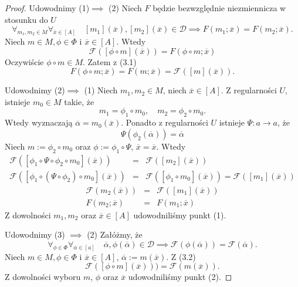 \documentclass[12pt,a4paper]{report}
\newcommand{\domkniecie}[1]{\left\lbrack{#1}\right\rbrack}
\begin{document}
\begin{proof}
Udowodnimy (1)$\implies$ (2)
Niech $F$ będzie bezwzględnie niezmiennicza w stosunku do $U$
\begin{equation}
\forall_{m_{1}, m_{2} \in M}  \forall_{\overline{x} \in \domkniecie{A}} \quad \domkniecie{m_1}(\overline{x}), \domkniecie{m_2}(\overline{x})\in \mathcal{D} \implies F(m_{1};\overline{x})=F(m_{2};\overline{x}).
\end{equation}
Niech $m \in M, \phi \in \Phi$ i $\overline{x} \in \domkniecie{A}$. Wtedy
$$
\mathcal{F}(\domkniecie{\phi \circ m}(\overline{x}))=F(\phi \circ m;\overline{x})
$$
Oczywiście $\phi \circ m \in M$. Zatem z (3.1)
$$
F(\phi \circ m; \overline{x})=F(m;\overline{x})=\mathcal{F}(\domkniecie{m}(\overline{x})).
$$

Udowodnimy (2)$\implies$ (1)
Niech $m_1,m_2 \in M$, niech $\overline{x} \in\domkniecie{A}$.
Z regularności $U$, istnieje $m_0\in M$ takie, że
$$
m_1=\phi_1\circ m_0, \quad m_2=\phi_2\circ m_0.
$$
Wtedy wyznaczają $\overline{\alpha}=m_0(\overline{x})$.
Ponadto z regularności $U$ istnieje $\Psi:a\to a$, że
$$
 \Psi(\phi_2(\overline{\alpha}))=\overline{\alpha}
$$
Niech $m:=\phi_2\circ m_0$ oraz $\phi:=\phi_1\circ\Psi$, $\overline{x}=\overline{x}$. Wtedy
\begin{eqnarray*}
\mathcal{F}(\domkniecie{\phi_1\circ \Psi\circ \phi_2 \circ m_0}(\overline{x})) & = & \mathcal{F}(\domkniecie{m_2}(\overline{x})) \\
\mathcal{F}(\domkniecie{\phi_1\circ(\Psi\circ \phi_2)\circ m_0}(\overline{x})) & = & \mathcal{F}(\domkniecie{\phi_1\circ m_0}(\overline{x})) = \mathcal{F}(\domkniecie{m_1}(\overline{x}))
\end{eqnarray*}
\begin{eqnarray*}
\mathcal{F}(m_2(\overline{x})) & = & \mathcal{F}(\domkniecie{m_1}(\overline{x}))\\
F(m_2;\overline{x}) & = & F(m_1;\overline{x})
\end{eqnarray*}
Z dowolności $m_1,m_2$ oraz $\overline{x} \in \domkniecie{A}$ udowodniliśmy punkt (1).

Udowodnimy (3) $\implies$ (2)
Załóżmy, że
\begin{equation}
\forall_{\phi \in \Phi} \forall_{\overline{\alpha} \in \domkniecie{a}} \quad \overline{\alpha}, \phi(\overline{\alpha})\in \mathcal{D} \implies \mathcal{F}(\phi(\overline{\alpha}))=\mathcal{F}(\overline{\alpha}).
\end{equation}
Niech $m\in M, \phi \in \Phi$ i $\overline{x} \in\domkniecie{A}$, $\overline{\alpha}:=m(\overline{x})$. Z (3.2)
$$
 \mathcal{F}(\domkniecie{\phi\circ m}(\overline{x})))=\mathcal{F}(m(\overline{x})).
$$
Z dowolności wyboru $m$, $\phi$ oraz $\overline{x}$ udowodniliśmy punkt (2).


\end{proof}
\end{document}
